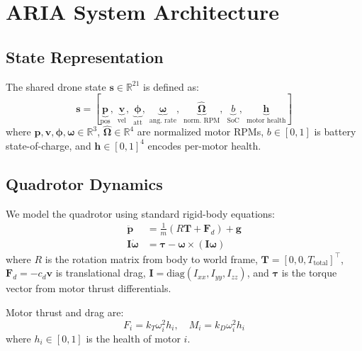 \documentclass[10pt,twocolumn]{article}
\begin{document}
\section{ARIA System Architecture}
\label{sec:architecture}

\subsection{State Representation}
The shared drone state $\mathbf{s} \in \mathbb{R}^{21}$ is defined as:
\begin{equation}
    \mathbf{s} = \left[
        \underbrace{\mathbf{p}}_{\text{pos}},\;
        \underbrace{\mathbf{v}}_{\text{vel}},\;
        \underbrace{\boldsymbol{\phi}}_{\text{att}},\;
        \underbrace{\boldsymbol{\omega}}_{\text{ang. rate}},\;
        \underbrace{\hat{\boldsymbol{\Omega}}}_{\text{norm. RPM}},\;
        \underbrace{b}_{\text{SoC}},\;
        \underbrace{\mathbf{h}}_{\text{motor health}}
    \right]
    \label{eq:state}
\end{equation}
where $\mathbf{p},\mathbf{v},\boldsymbol{\phi},\boldsymbol{\omega}
\in \mathbb{R}^3$, $\hat{\boldsymbol{\Omega}} \in \mathbb{R}^4$ are
normalized motor RPMs, $b \in [0,1]$ is battery state-of-charge, and
$\mathbf{h} \in [0,1]^4$ encodes per-motor health.

\subsection{Quadrotor Dynamics}
We model the quadrotor using standard rigid-body equations:
\begin{align}
    \ddot{\mathbf{p}} &= \frac{1}{m}\left(R\mathbf{T} + \mathbf{F}_d\right) + \mathbf{g}
    \label{eq:translation}\\
    \mathbf{I}\dot{\boldsymbol{\omega}} &= \boldsymbol{\tau} -
    \boldsymbol{\omega} \times (\mathbf{I}\boldsymbol{\omega})
    \label{eq:rotation}
\end{align}
where $R$ is the rotation matrix from body to world frame,
$\mathbf{T} = [0, 0, T_\text{total}]^\top$, $\mathbf{F}_d = -c_d\mathbf{v}$
is translational drag, $\mathbf{I} = \text{diag}(I_{xx},I_{yy},I_{zz})$,
and $\boldsymbol{\tau}$ is the torque vector from motor thrust differentials.

Motor thrust and drag are:
\begin{equation}
    F_i = k_T \omega_i^2 h_i, \quad M_i = k_D \omega_i^2 h_i
\end{equation}
where $h_i \in [0,1]$ is the health of motor $i$.
\end{document}
